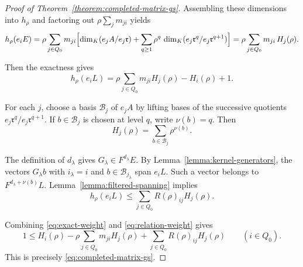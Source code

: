 \documentclass[10pt,a4paper]{amsart}
\newcommand{\rA}{\mathfrak r}
\begin{document}
\begin{proof}[Proof of Theorem~\ref{theorem:completed-matrix-gs}]
Assembling these dimensions into $h_\rho$ and factoring out
$\rho\sum_jm_{ji}$ yields
\[
 h_\rho(e_iE)
 =\rho\sum_{j\in Q_0}m_{ji}
  \Bigl[\dim_K(e_jA/e_j\rA)
   +\sum_{q\geq1}\rho^{q}\,
    \dim_K(e_j\rA^{q}/e_j\rA^{q+1})
  \Bigr]
 =\rho\sum_{j\in Q_0}m_{ji}\,H_j(\rho).
\]

Then the exactness gives
		\begin{equation}
			\label{eq:exact-weight}
			h_\rho(e_iL)
			=\rho\sum_{j\in Q_0}m_{ji}H_j(\rho)-H_i(\rho)+1.
		\end{equation}
		
		For each $j$, choose a basis $\mathcal B_j$ of $e_jA$ by lifting bases of
		the successive quotients $e_j\rA^q/e_j\rA^{q+1}$.  If
		$b\in\mathcal B_j$ is chosen at level $q$, write $\nu(b)=q$.  Then
		\[
		H_j(\rho)=\sum_{b\in\mathcal B_j}\rho^{\nu(b)}.
		\]
		
		The definition of $d_\lambda$ gives
		$G_\lambda\in F^{d_\lambda}E$.  By
		Lemma~\ref{lemma:kernel-generators}, the vectors $G_\lambda b$ with
		$i_\lambda=i$ and $b\in\mathcal B_{j_\lambda}$ span $e_iL$.
		Such a vector belongs to $F^{d_\lambda+\nu(b)}L$.
		Lemma~\ref{lemma:filtered-spanning} implies
		\begin{equation}
			\label{eq:relation-weight}
			h_\rho(e_iL)
			\leq\sum_{j\in Q_0}R(\rho)_{ij}H_j(\rho).
		\end{equation}
		
		Combining \eqref{eq:exact-weight} and \eqref{eq:relation-weight} gives
		\[
		1\leq H_i(\rho)-\rho\sum_{j\in Q_0}m_{ji}H_j(\rho)
		+\sum_{j\in Q_0}R(\rho)_{ij}H_j(\rho)
		\qquad(i\in Q_0).
		\]
		This is precisely \eqref{eq:completed-matrix-gs}.
	\end{proof}
\end{document}
